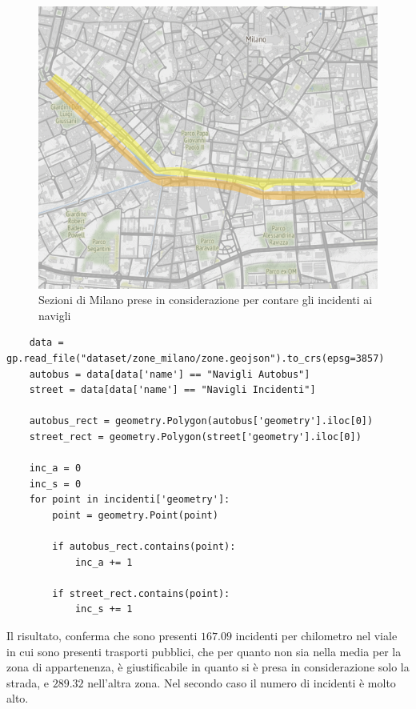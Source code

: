 \documentclass[a4paper]{report}
\begin{document}
\begin{figure}
    \includegraphics[width=\linewidth]{../src/atm/zona_navigli_rect.png}
    \caption{Sezioni di Milano prese in considerazione per contare gli incidenti ai navigli}
    \label{fig:zona-navigli-rect}
\end{figure}

\begin{lstlisting}
    data = gp.read_file("dataset/zone_milano/zone.geojson").to_crs(epsg=3857)
    autobus = data[data['name'] == "Navigli Autobus"]
    street = data[data['name'] == "Navigli Incidenti"]

    autobus_rect = geometry.Polygon(autobus['geometry'].iloc[0])
    street_rect = geometry.Polygon(street['geometry'].iloc[0])

    inc_a = 0
    inc_s = 0
    for point in incidenti['geometry']: 
        point = geometry.Point(point)

        if autobus_rect.contains(point): 
            inc_a += 1
        
        if street_rect.contains(point): 
            inc_s += 1
\end{lstlisting}

Il risultato, conferma che sono presenti $167.09$ incidenti per chilometro 
nel viale in cui sono presenti trasporti pubblici, che per quanto non sia nella media per la zona 
di appartenenza, è giustificabile in quanto si è presa in considerazione solo la strada, 
e $289.32$ nell'altra zona. Nel secondo caso il numero di incidenti è molto alto.
\end{document}
